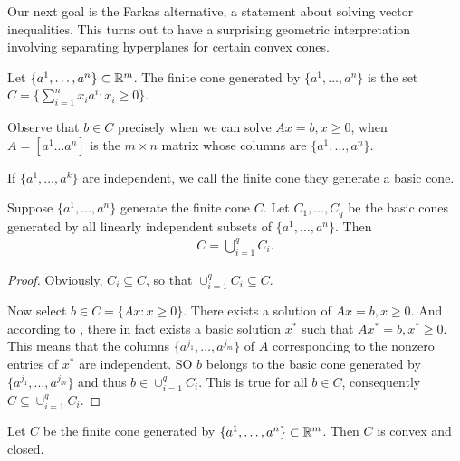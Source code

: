 Our next goal is the Farkas alternative, a statement about solving vector inequalities.
This turns out to have a surprising geometric interpretation involving separating hyperplanes for certain convex cones.

\begin{definition}
Let $\{ a^1, \dots, a^n \} \subset \mathbb{R}^m$.
The finite cone generated by $\{ a^1, \dots, a^n \}$ is the set $C = \{ \sum _{i=1}^{n} x_i a^i : x_i \ge 0 \}$.
\end{definition}

Observe that $b \in C$ precisely when we can solve $Ax =b, x \ge 0$, when $A = [a^1 \dots a^n]$ is the $m \times n$ matrix whose columns are $\{ a^1, \dots, a^n \}$.

\begin{definition}
If $\{ a^1, \dots, a^k \}$ are independent, we call the finite cone they generate a basic cone.
\end{definition}

\begin{lemma}
Suppose $\{ a^1, \dots, a^n \}$ generate the finite cone $C$. 
Let $C_1, \dots, C_q$ be the basic cones generated by all linearly independent subsets of $\{ a^1, \dots, a^n \}$.
Then 
\begin{align}
C = \bigcup _{i=1} ^{q} C_i.
\end{align}
\end{lemma}

\begin{proof}
Obviously, $C_i \subseteq C$, so that $\cup_{i=1}^{q} C_i \subseteq C$.

Now select $b \in C = \{ A x : x \ge 0 \}$. 
There exists a solution of $A x = b, x \ge 0$.
And according to , there in fact exists a basic solution $x^*$ such that $A x^* = b, x^* \ge 0$.
This means that the columns $\{a^{j_1}, \dots, a^{j_m} \}$ of $A$ corresponding to the nonzero entries of $x^*$ are independent. 
SO $b$ belongs to the basic cone generated by $\{a^{j_1}, \dots, a^{j_m} \}$ and thus $b \in \cup_{i=1}^{q} C_i$.
This is true for all $b \in C$, consequently $C \subseteq \cup_{i=1}^{q} C_i$.
\end{proof}

\begin{theorem}
Let $C$ be the finite cone generated by $\{ a^1, \dots, a^n \} \subset \mathbb{R}^m$.
Then $C$ is convex and closed.
\end{theorem}

